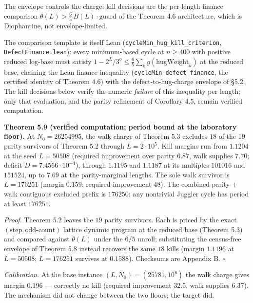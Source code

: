 \documentclass[12pt]{article}
\begin{document}
The envelope controls the charge; kill decisions are the per-length
finance comparison \(\theta(L)>\tfrac65\,B(L)\cdot\text{guard}\) of the
Theorem 4.6 architecture, which is Diophantine, not envelope-limited.

The comparison template is itself Lean
(\texttt{\nolinkurl{cycleMin_hug_kill_criterion}},
\texttt{\nolinkurl{DefectFinance.lean}}): every minimum-based cycle at
\(n\ge 400\) with positive reduced log-base must satisfy
\(1-2^L/3^o\le\tfrac65\sum_k g(\text{hugWeight}_k)\) at the reduced
base, chaining the Lean finance inequality
(\texttt{\nolinkurl{cycleMin_defect_finance}}, the certified identity of
Theorem 4.6) with the defect-to-hug-charge envelope of §5.2. The kill
decisions below verify the numeric \emph{failure} of this inequality per
length; only that evaluation, and the parity refinement of Corollary
4.5, remain verified computation.

\textbf{Theorem 5.9 (verified computation; period bound at the
laboratory floor).} At \(N_0=26254995\), the walk charge of Theorem 5.3
excludes \(18\) of the \(19\) parity survivors of Theorem 5.2 through
\(L=2\cdot 10^5\). Kill margins run from \(1.1204\) at the seed
\(L=50508\) (required improvement over parity \(6.87\), walk supplies
\(7.70\); deficit \(D=7.4566\cdot 10^{-4}\)), through \(1.1195\) and
\(1.1187\) at its multiples \(101016\) and \(151524\), up to \(7.69\) at
the parity-marginal lengths. The sole walk survivor is \(L=176251\)
(margin \(0.159\); required improvement \(48\)). The combined parity +
walk contiguous excluded prefix is \(176250\): any nontrivial Juggler
cycle has period at least \(176251\).

\emph{Proof.} Theorem 5.2 leaves the \(19\) parity survivors. Each is
priced by the exact \((\text{step},\text{odd-count})\) lattice dynamic
program at the reduced base (Theorem 5.3) and compared against
\(\theta(L)\) under the \(6/5\) unroll; substituting the census-free
envelope of Theorem 5.8 instead recovers the same \(18\) kills (margin
\(1.1196\) at \(L=50508\); \(L=176251\) survives at \(0.1588\)).
Checksums are Appendix B. \(\square\)

\emph{Calibration.} At the base instance \((L,N_0)=(25781,10^6)\) the
walk charge gives margin \(0.196\) --- correctly no kill (required
improvement \(32.5\), walk supplies \(6.37\)). The mechanism did not
change between the two floors; the target did.
\end{document}
